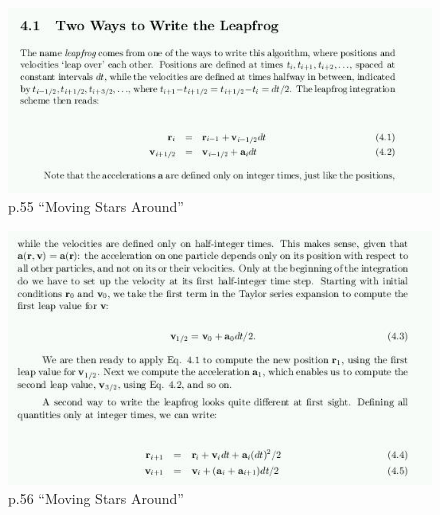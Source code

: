 \begin{figure}[!htbp]
  \centering
  \includegraphics[width=\textwidth]{graphics/nbody-fig4.png}
  \caption{p.55 ``Moving Stars Around''}
\end{figure}

\begin{figure}[!htbp]
  \centering
  \includegraphics[width=\textwidth]{graphics/nbody-fig5.png}
  \caption{p.56 ``Moving Stars Around''}
\end{figure}


